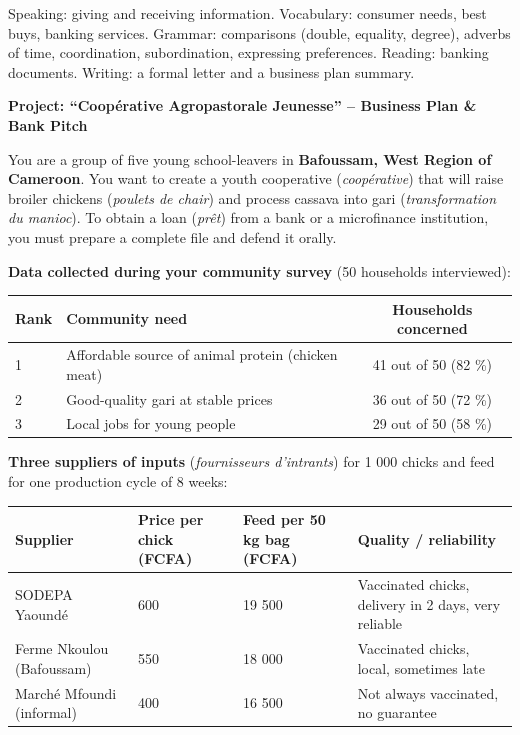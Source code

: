 \documentclass[11pt]{article}
\newcounter{popsec}
\newcounter{popsub}
\newcommand{\courssub}[1]{%
  \stepcounter{popsub}%
  \par\vspace{9pt}\noindent{\popxbold\fontsize{11.5}{13}\selectfont\color{popink}{\color{poporange}\thepopsec.\thepopsub}\hspace{6pt}#1}\par\nopagebreak\vspace{4pt}
}
\begin{document}
\begin{aretenir}
Speaking: giving and receiving information. Vocabulary: consumer needs, best buys, banking services. Grammar: comparisons (double, equality, degree), adverbs of time, coordination, subordination, expressing preferences. Reading: banking documents. Writing: a formal letter and a business plan summary.
\end{aretenir}

\courssub{Situation}

\textbf{Project: ``Coopérative Agropastorale Jeunesse'' -- Business Plan \& Bank Pitch}

You are a group of five young school-leavers in \textbf{Bafoussam, West Region of Cameroon}. You want to create a youth cooperative (\emph{coopérative}) that will raise broiler chickens (\emph{poulets de chair}) and process cassava into gari (\emph{transformation du manioc}). To obtain a loan (\emph{prêt}) from a bank or a microfinance institution, you must prepare a complete file and defend it orally.

\textbf{Data collected during your community survey} (50 households interviewed):

\begin{center}
\begin{tabularx}{\linewidth}{|l|X|c|}\hline
\rowcolor{popblueL} \textbf{Rank} & \textbf{Community need} & \textbf{Households concerned} \\ \hline
1 & Affordable source of animal protein (chicken meat) & 41 out of 50 (82 \%) \\ \hline
2 & Good-quality gari at stable prices & 36 out of 50 (72 \%) \\ \hline
3 & Local jobs for young people & 29 out of 50 (58 \%) \\ \hline
\end{tabularx}
\end{center}

\textbf{Three suppliers of inputs} (\emph{fournisseurs d'intrants}) for 1 000 chicks and feed for one production cycle of 8 weeks:

\begin{center}
\begin{tabularx}{\linewidth}{|l|X|X|X|}\hline
\rowcolor{popblueL} \textbf{Supplier} & \textbf{Price per chick (FCFA)} & \textbf{Feed per 50 kg bag (FCFA)} & \textbf{Quality / reliability} \\ \hline
SODEPA Yaoundé & 600 & 19 500 & Vaccinated chicks, delivery in 2 days, very reliable \\ \hline
Ferme Nkoulou (Bafoussam) & 550 & 18 000 & Vaccinated chicks, local, sometimes late \\ \hline
Marché Mfoundi (informal) & 400 & 16 500 & Not always vaccinated, no guarantee \\ \hline
\end{tabularx}
\end{center}
\end{document}
